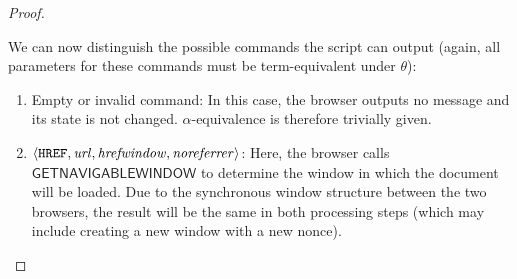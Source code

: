 \documentclass[letterpaper,onecolumn,10pt]{article}
\begin{document}
\begin{proof}
\begin{description}
\begin{description}
\begin{enumerate}
          We can now distinguish the possible commands the script can
          output (again, all parameters for these commands must be
          term-equivalent under $\theta$):
  
          \begin{enumerate}
          \item Empty or invalid command: In this case, the browser
            outputs no message and its state is not changed.
            $\alpha$-equivalence is therefore trivially given.
          \item\label{ratt-sends-href-command}
            $\langle\mathtt{HREF}, \mathit{url}, \mathit{hrefwindow}, \mathit{noreferrer}\rangle$:
            Here, the browser calls $\mathsf{GETNAVIGABLEWINDOW}$ to
            determine the window in which the document will be loaded.
            Due to the synchronous window structure between the two
            browsers, the result will be the same in both processing
            steps (which may include creating a new window with a new
            nonce).
  

\end{enumerate}
\end{enumerate}
\end{description}
\end{description}
\end{proof}
\end{document}
